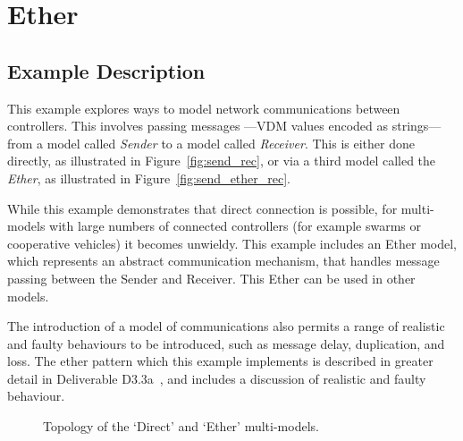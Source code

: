 \section{Ether}
\label{sec:ether}

\subsection{Example Description}
\label{sec:ether_desc}

This example explores ways to model network communications between controllers. This involves passing messages ---VDM values encoded as strings--- from a model called \emph{Sender} to a model called \emph{Receiver}. This is either done directly, as illustrated in Figure~\ref{fig:send_rec}, or via a third model called the \emph{Ether}, as illustrated in Figure~\ref{fig:send_ether_rec}.

While this example demonstrates that direct connection is possible, for multi-models with large numbers of connected controllers (for example swarms or cooperative vehicles) it becomes unwieldy. This example includes an Ether model, which represents an abstract communication mechanism, that handles message passing between the Sender and Receiver. This Ether can be used in other models.

The introduction of a model of communications also permits a range of realistic and faulty behaviours to be introduced, such as message delay, duplication, and loss. The ether pattern which this example implements is described in greater detail in Deliverable D3.3a~\cite{INTOCPSD3.3a}, and includes a discussion of realistic and faulty behaviour.

\begin{figure}[h]
\begin{center}
\hspace{2em}
\caption{Topology of the `Direct' and `Ether' multi-models.}
\label{fig:ether_topology}
\end{center}
\end{figure}

